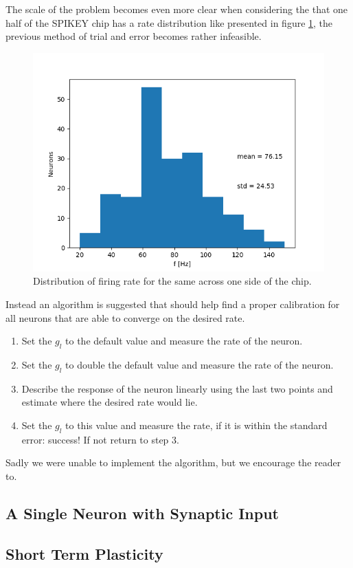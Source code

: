 \documentclass[10pt,a4paper]{article}
\begin{document}
The scale of the problem becomes even more clear when considering the that one
half of the SPIKEY chip has a rate distribution like presented in figure
\ref{fig:distribution}, the previous method of trial and error becomes rather
infeasible.

\begin{figure}[ht]
    \centering
    \includegraphics[width=.5\textwidth]{figures/rate-distribution.png}
    \caption{Distribution of firing rate for the same across one side of the
    chip.}
    \label{fig:distribution}
\end{figure}

Instead an algorithm is suggested that should help find a proper calibration for
all neurons that are able to converge on the desired rate.
\begin{enumerate}
    \item Set the $g_l$ to the default value and measure the rate of the neuron.
    \item Set the $g_l$ to double the default value and measure the rate of the
        neuron.
    \item Describe the response of the neuron linearly using the last two
        points and estimate where the desired rate would lie.
    \item Set the $g_l$ to this value and measure the rate, if it is within the
        standard error: success! If not return to step 3.
\end{enumerate}
Sadly we were unable to implement the algorithm, but we encourage the reader
to.


\subsection{A Single Neuron with Synaptic Input}

\subsection{Short Term Plasticity}
\end{document}
